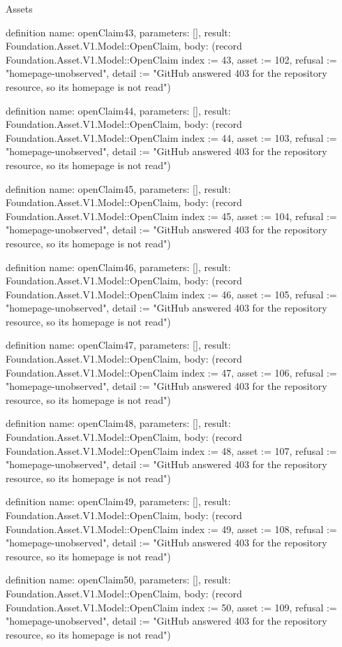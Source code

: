 \begin{lexlean}{Assets}
\begin{semanticmodule}
definition{
  name: openClaim43,
  parameters: [],
  result: Foundation.Asset.V1.Model::OpenClaim,
  body: (record Foundation.Asset.V1.Model::OpenClaim {index := 43, asset := 102, refusal := "homepage-unobserved", detail := "GitHub answered 403 for the repository resource, so its homepage is not read"})
}

definition{
  name: openClaim44,
  parameters: [],
  result: Foundation.Asset.V1.Model::OpenClaim,
  body: (record Foundation.Asset.V1.Model::OpenClaim {index := 44, asset := 103, refusal := "homepage-unobserved", detail := "GitHub answered 403 for the repository resource, so its homepage is not read"})
}

definition{
  name: openClaim45,
  parameters: [],
  result: Foundation.Asset.V1.Model::OpenClaim,
  body: (record Foundation.Asset.V1.Model::OpenClaim {index := 45, asset := 104, refusal := "homepage-unobserved", detail := "GitHub answered 403 for the repository resource, so its homepage is not read"})
}

definition{
  name: openClaim46,
  parameters: [],
  result: Foundation.Asset.V1.Model::OpenClaim,
  body: (record Foundation.Asset.V1.Model::OpenClaim {index := 46, asset := 105, refusal := "homepage-unobserved", detail := "GitHub answered 403 for the repository resource, so its homepage is not read"})
}

definition{
  name: openClaim47,
  parameters: [],
  result: Foundation.Asset.V1.Model::OpenClaim,
  body: (record Foundation.Asset.V1.Model::OpenClaim {index := 47, asset := 106, refusal := "homepage-unobserved", detail := "GitHub answered 403 for the repository resource, so its homepage is not read"})
}

definition{
  name: openClaim48,
  parameters: [],
  result: Foundation.Asset.V1.Model::OpenClaim,
  body: (record Foundation.Asset.V1.Model::OpenClaim {index := 48, asset := 107, refusal := "homepage-unobserved", detail := "GitHub answered 403 for the repository resource, so its homepage is not read"})
}

definition{
  name: openClaim49,
  parameters: [],
  result: Foundation.Asset.V1.Model::OpenClaim,
  body: (record Foundation.Asset.V1.Model::OpenClaim {index := 49, asset := 108, refusal := "homepage-unobserved", detail := "GitHub answered 403 for the repository resource, so its homepage is not read"})
}

definition{
  name: openClaim50,
  parameters: [],
  result: Foundation.Asset.V1.Model::OpenClaim,
  body: (record Foundation.Asset.V1.Model::OpenClaim {index := 50, asset := 109, refusal := "homepage-unobserved", detail := "GitHub answered 403 for the repository resource, so its homepage is not read"})
}


\end{semanticmodule}
\end{lexlean}
